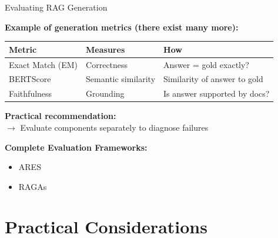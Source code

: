 \documentclass[11pt,compress,t,notes=noshow, xcolor=table]{beamer}
\begin{document}

\begin{frame}{Evaluating RAG Generation}

\vfill

\textbf{Example of generation metrics (there exist many more):}

\vspace{1em}

\small
\begin{tabular}{lll}
\toprule
\textbf{Metric} & \textbf{Measures} & \textbf{How} \\
\midrule
Exact Match (EM) & Correctness & Answer = gold exactly? \\
BERTScore & Semantic similarity & Similarity of answer to gold \\
Faithfulness & Grounding & Is answer supported by docs? \\
\bottomrule
\end{tabular}
\normalsize

\vspace{1em}

\textbf{Practical recommendation:}\\ $\to$ Evaluate components separately to diagnose failures

\vspace{1em}

\textbf{Complete Evaluation Frameworks:} 
	\begin{itemize}
		\item ARES      
		\item RAGAs   
	\end{itemize}
				
\vfill

\end{frame}


\section{Practical Considerations}
\end{document}
